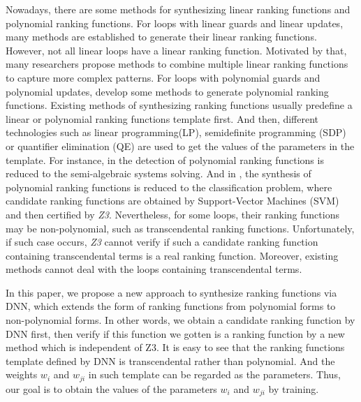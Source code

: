 Nowadays, there are some methods for synthesizing linear ranking functions and polynomial ranking functions. For loops with linear guards and linear updates, many methods\cite{colon2002practical}\cite{10.1007/978-3-540-24622-0_20}\cite{coloon2001synthesis}\cite{yuan2019detecting}\cite{li2019on} are established to generate their linear ranking functions. However, not all linear loops have a linear ranking function. Motivated by that, many researchers propose methods\cite{10.1145/2629488}\cite{bagnara2013eventual}\cite{bradley2005polyranking}\cite{ben2017multiphase}\cite{bradley2005linear}\cite{leike2014ranking}\cite{li2016depth} to combine multiple linear ranking functions to capture more complex patterns. For loops with polynomial guards and polynomial updates, \cite{chen2007discovering}\cite{cousot2005proving}\cite{shen2013generating}\cite{yuan2019ranking} develop some methods to generate polynomial ranking functions. Existing methods of synthesizing ranking functions usually predefine a linear or polynomial ranking functions template first. And then, different technologies such as linear programming(LP)\cite{colon2002practical}\cite{10.1007/978-3-540-24622-0_20}\cite{coloon2001synthesis}\cite{10.1145/2629488}, semidefinite programming (SDP)\cite{cousot2005proving}\cite{shen2013generating} or quantifier elimination (QE)\cite{chen2007discovering} are used to get the values of the parameters in the template. For instance, in \cite{chen2007discovering} the detection of polynomial ranking functions is reduced to the semi-algebraic systems solving. And in \cite{yuan2019ranking}, the synthesis of polynomial ranking functions is reduced to the classification problem, where candidate ranking functions are obtained by Support-Vector Machines (SVM)\cite{fan2008liblinear:}\cite{li2019synthesizing} and then certified by \emph{Z3}\cite{10.1007/978-3-540-78800-3_24}. Nevertheless, for some loops, their ranking functions may be non-polynomial, such as transcendental ranking functions. Unfortunately, if such case occurs, \emph{Z3} cannot verify if such a candidate ranking function containing transcendental terms is a real ranking function. Moreover, existing methods cannot deal with the loops containing transcendental terms.

In this paper, we propose a new approach to synthesize ranking functions via DNN, which extends the form of ranking functions from polynomial forms to non-polynomial forms. In other words, we obtain a candidate ranking function by DNN first, then verify if this function we gotten is a ranking function by a new method which is independent of Z3. It is easy to see that the ranking functions template defined by DNN is transcendental rather than polynomial. And the weights $w_{i}$ and $w_{ji}$ in such template can be regarded as the parameters. Thus, our goal is to obtain the values of the parameters $w_{i}$ and $w_{ji}$ by training.

